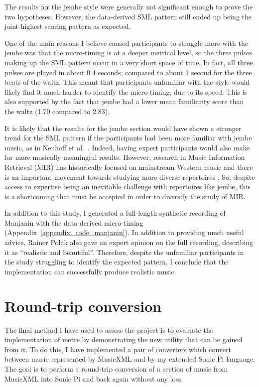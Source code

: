 \documentclass[12pt,twoside,openright]{report}
\begin{document}
The results for the jembe style were generally not significant enough to prove
the two hypotheses. However, the data-derived SML pattern still ended up being
the joint-highest scoring pattern as expected.

One of the main reasons I believe caused participants to struggle more with the
jembe was that the micro-timing is at a deeper metrical level, so the three
pulses making up the SML pattern occur in a very short space of time. In fact, all three pulses are
played in about 0.4 seconds, compared to about 1 second for the three beats of
the waltz. This meant that participants unfamiliar with the style would likely
find it much harder to identify the micro-timing, due to its speed. This is also
supported by the fact that jembe had a lower mean familiarity score than the
waltz (1.70 compared to 2.83).

It is likely that the results for the jembe section would have shown a stronger
trend for the SML pattern if the participants had been more familiar with jembe
music, as in Neuhoff et al.\ \cite{neuhoff2017}. Indeed, having expert participants would also make for more musically meaningful results. However, research in Music Information Retrieval (MIR) has historically focused on mainstream Western music \cite{gomez2013} and there is an important movement towards studying more diverse repertoires \cite{born2020}.
So, despite access to expertise being an inevitable challenge with repertoires like jembe, this is a shortcoming that must be accepted in order to diversify the study of MIR.

In addition to this study, I generated a full-length synthetic recording of
Manjanin with the data-derived micro-timing (Appendix~\ref{appendix_code_manjanin}). In addition to providing much
useful advice, Rainer Polak also gave an expert opinion on the full recording,
describing it as ``realistic and beautiful''. Therefore, despite the unfamiliar
participants in the study struggling to identify the expected pattern, I conclude that the implementation can successfully produce realistic music.
\pagebreak



\section{Round-trip conversion} \label{metre_evaluation}

The final method I have used to assess the project is to evaluate the
implementation of metre by demonstrating the new utility that can be gained from
it. To do this, I have implemented a pair of converters which convert between
music represented by MusicXML and by my extended Sonic Pi language. The goal is
to perform a round-trip conversion of a section of music from MusicXML into Sonic Pi and back again without any loss.
\end{document}
